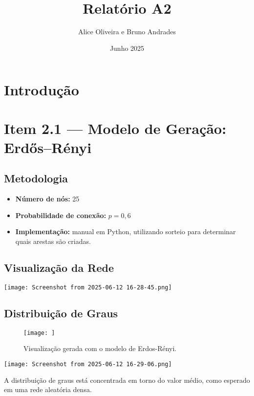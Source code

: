 \documentclass{article}
\title{Relatório A2}
\author{Alice Oliveira e Bruno Andrades}
\date{Junho 2025}
\begin{document}
\maketitle

\section{Introdução}

\section*{Item 2.1 — Modelo de Geração: Erdős–Rényi}

\subsection*{Metodologia}

\begin{itemize}
    \item \textbf{Número de nós:} 25
    \item \textbf{Probabilidade de conexão:} \( p = 0{,}6 \)
    \item \textbf{Implementação:} manual em Python, utilizando sorteio para determinar quais arestas são criadas.
\end{itemize}

\subsection*{Visualização da Rede}

\begin{center}
    \texttt{[image: Screenshot from 2025-06-12 16-28-45.png]}
\end{center}

\subsection*{Distribuição de Graus}

\begin{figure}
    \centering
    \texttt{[image: ]}
    \caption{Visualização gerada com o modelo de Erdos-Rényi.}
    \label{fig:enter-label}
\end{figure}
\begin{center}
    \texttt{[image: Screenshot from 2025-06-12 16-29-06.png]}
\end{center}

A distribuição de graus está concentrada em torno do valor médio, como esperado em uma rede aleatória densa.
\end{document}
